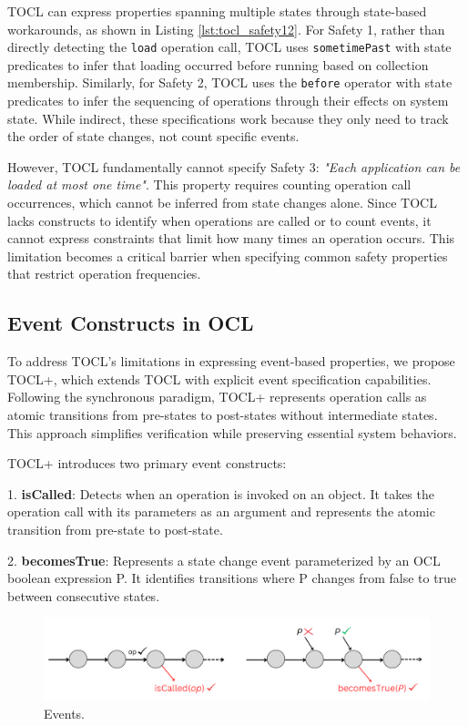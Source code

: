 TOCL can express properties spanning multiple states through state-based workarounds, 
as shown in Listing \ref{lst:tocl_safety12}. For Safety 1, rather than directly 
detecting the \texttt{load} operation call, TOCL uses \texttt{sometimePast} with 
state predicates to infer that loading occurred before running based on collection 
membership. Similarly, for Safety 2, TOCL uses the \texttt{before} operator with 
state predicates to infer the sequencing of operations through their effects on 
system state. While indirect, these specifications work because they only need to 
track the order of state changes, not count specific events.

However, TOCL fundamentally cannot specify Safety 3: \textit{"Each application can 
be loaded at most one time"}. This property requires counting operation call 
occurrences, which cannot be inferred from state changes alone. Since TOCL lacks 
constructs to identify when operations are called or to count events, it cannot 
express constraints that limit how many times an operation occurs. This limitation 
becomes a critical barrier when specifying common safety properties that restrict 
operation frequencies.

\subsection{Event Constructs in OCL}

\hspace{1cm} To address TOCL's limitations in expressing event-based properties, 
we propose TOCL+, which extends TOCL with explicit event specification capabilities. 
Following the synchronous paradigm, TOCL+ represents operation calls as atomic 
transitions from pre-states to post-states without intermediate states. This approach 
simplifies verification while preserving essential system behaviors.

TOCL+ introduces two primary event constructs:

1. \textbf{isCalled}: Detects when an operation is invoked on an object. It takes 
the operation call with its parameters as an argument and represents the atomic 
transition from pre-state to post-state.

2. \textbf{becomesTrue}: Represents a state change event parameterized by an OCL 
boolean expression P. It identifies transitions where P changes from false to true 
between consecutive states.

\begin{figure}
    \centering
    \includegraphics[width=1\textwidth]{figures/c2/events_visual.png}
    \caption{Events.}
    \label{fig:event_constructs}
\end{figure}

